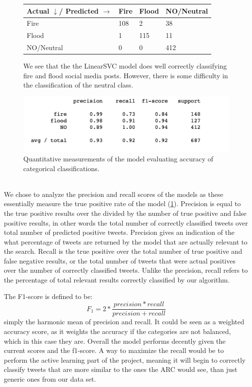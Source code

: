 \documentclass[titlepage, 12pt]{article}
\begin{document}
 \begin{figure}[h!]
\begin{center}
\begin{tabu} to 0.9\textwidth { | X[c] | X[c] |X[c] |X[c] |}
 \hline
  Actual $\downarrow$/ Predicted $\rightarrow$& Fire & Flood & NO/Neutral \\
 \hline
  Fire & 108 & 2 & 38  \\
 \hline 
 Flood & 1 & 115 & 11 \\
 \hline
 NO/Neutral & 0 & 0 & 412 \\
 \hline
\end{tabu}
\end{center}
\caption{We see that the the LinearSVC model does well correctly classifying fire and flood social media posts. However, there is some difficulty in the classification of the neutral class.}
\end{figure}
 
\begin{figure}[h!]
\centering
\includegraphics[scale=0.5]{pics/stats.png}
\caption{Quantitative measurements of the model evaluating accuracy of categorical classifications.}
\label{fig:stats}
\end{figure}\\

We chose to analyze the precision and recall scores of the models as these essentially measure the true positive rate of the model (\ref{fig:stats}). Precision is equal to the true positive results over the divided by the number of true positive and false positive results, in other words the total number of correctly classified tweets over total number of predicted positive tweets. Precision gives an indication of the what percentage of tweets are returned by the model that are actually relevant to the search. Recall is the true positive over the total number of true positive and false negative results, or the total number of tweets that were actual positives over the number of correctly classified tweets. Unlike the precision, recall refers to the percentage of total relevant results correctly classified by our algorithm. 

The F1-score is defined to be:
\begin{equation}
    F_1 = 2 * \frac{precision * recall}{precision+recall}
\end{equation}
simply the harmonic mean of precision and recall. It could be seen as a weighted accuracy score, as it weights the accuracy if the categories are not balanced, which in this case they are. Overall the model performs decently given the current scores and the f1-score. A way to maximize the recall would be to perform the active learning part of the project, meaning it will begin to correctly classify tweets that are more similar to the ones the ARC would see, than just generic ones from our data set. 
\end{document}
